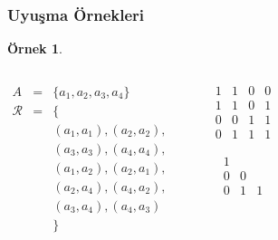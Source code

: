 \documentclass[dvipsnames]{beamer}
\theoremstyle{definition}
\theoremstyle{example}
\newtheorem{ornek}[theorem]{Örnek}
\theoremstyle{plain}
\begin{document}
\begin{frame}
  \frametitle{Uyuşma Örnekleri}

  \begin{ornek}
    \begin{columns}
      \begin{eqnarray*}
        A           & = & \{a_1,a_2,a_3,a_4\}\\
        \mathcal{R} & = & \{\\
                    &   & (a_1,a_1),(a_2,a_2),\\
                    &   & (a_3,a_3),(a_4,a_4),\\
                    &   & (a_1,a_2),(a_2,a_1),\\
                    &   & (a_2,a_4),(a_4,a_2),\\
                    &   & (a_3,a_4),(a_4,a_3)\\
                    &   & \}
      \end{eqnarray*}

      \begin{center}

        \bigskip
      \end{center}

      \pause
      \begin{center}
        \[ \begin{array}{|cccc|}
            1  &  1  &  0  &  0\\
            1  &  1  &  0  &  1\\
            0  &  0  &  1  &  1\\
            0  &  1  &  1  &  1
          \end{array} \]

        \[ \begin{array}{|ccc|}
            1  &     & \\
            0  &  0  & \\
            0  &  1  &  1
          \end{array} \]
      \end{center}
    \end{columns}
  \end{ornek}
\end{frame}
\end{document}

